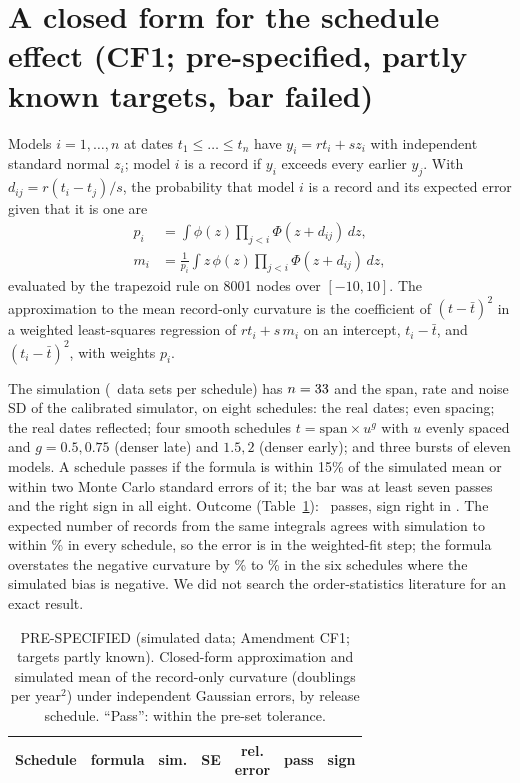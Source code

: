 \documentclass[aps,pre,twocolumn,superscriptaddress,nofootinbib,9pt]{revtex4-2}
\begin{document}
\section{A closed form for the schedule effect (CF1; pre-specified, partly known targets, bar failed)}\label{sup:cf}
Models $i=1,\dots,n$ at dates $t_1\le\dots\le t_n$ have $y_i=rt_i+s z_i$ with independent standard normal $z_i$; model $i$ is a record if $y_i$ exceeds every earlier $y_j$. With $d_{ij}=r(t_i-t_j)/s$, the probability that model $i$ is a record and its expected error given that it is one are
\begin{equation}
\begin{split}
p_i&=\int\phi(z)\prod_{j<i}\Phi(z+d_{ij})\,dz,\\
m_i&=\frac{1}{p_i}\int z\,\phi(z)\prod_{j<i}\Phi(z+d_{ij})\,dz,
\end{split}
\end{equation}
evaluated by the trapezoid rule on 8001 nodes over $[-10,10]$. The approximation to the mean record-only curvature is the coefficient of $(t-\bar t)^2$ in a weighted least-squares regression of $rt_i+s\,m_i$ on an intercept, $t_i-\bar t$, and $(t_i-\bar t)^2$, with weights $p_i$.

The simulation (\cfReps\ data sets per schedule) has $n=33$ and the span, rate and noise SD of the calibrated simulator, on eight schedules: the real dates; even spacing; the real dates reflected; four smooth schedules $t=\text{span}\times u^{g}$ with $u$ evenly spaced and $g=0.5,0.75$ (denser late) and $1.5,2$ (denser early); and three bursts of eleven models. A schedule passes if the formula is within 15\% of the simulated mean or within two Monte Carlo standard errors of it; the bar was at least seven passes and the right sign in all eight. Outcome (Table~\ref{tab:cf}): \cfPass\ passes, sign right in \cfSign. The expected number of records from the same integrals agrees with simulation to within \cfRecErr\% in every schedule, so the error is in the weighted-fit step; the formula overstates the negative curvature by \cfErrMin\% to \cfErrMax\% in the six schedules where the simulated bias is negative. We did not search the order-statistics literature for an exact result.

\begin{table}[H]
\caption{PRE-SPECIFIED (simulated data; Amendment CF1; targets partly known). Closed-form approximation and simulated mean of the record-only curvature (doublings per year$^2$) under independent Gaussian errors, by release schedule. ``Pass'': within the pre-set tolerance.}
\label{tab:cf}
\tiny\setlength{\tabcolsep}{1.5pt}
\begin{ruledtabular}
\begin{tabular}{lcccccc}
Schedule & formula & sim. & SE & \shortstack{rel.\\error} & pass & sign \\
\hline

\end{tabular}
\end{ruledtabular}
\end{table}
\end{document}
